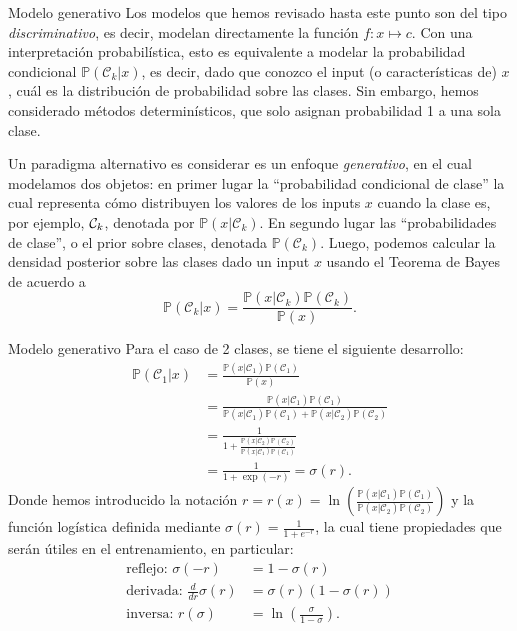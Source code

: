 \documentclass[9pt]{beamer}
\begin{document}
\begin{frame}{Modelo generativo}
Los modelos que hemos revisado hasta este punto son del tipo \emph{discriminativo}, es decir, modelan directamente la función $f:x\mapsto c$. Con una interpretación probabilística, esto es equivalente a modelar la probabilidad condicional $\mathbb{P}(\mathcal{C}_k|x)$, es decir, dado que conozco el input (o características de) $x$, cuál es la distribución de probabilidad sobre las clases. Sin embargo, hemos considerado métodos determinísticos, que solo asignan probabilidad 1 a una sola clase. \pause
\vspace{0.5cm}

Un paradigma alternativo es considerar es un enfoque \emph{generativo}, en el cual modelamos dos  objetos: en primer lugar la ``probabilidad condicional de clase'' la cual representa cómo distribuyen los valores de los inputs $x$ cuando la  clase es, por  ejemplo, ${\mathcal C}_k$, denotada por $\mathbb{P}(x|\mathcal{C}_k)$. En segundo lugar las ``probabilidades de clase'', o el prior sobre clases, denotada $\mathbb{P}(\mathcal{C}_k)$. Luego, podemos calcular la densidad posterior sobre las clases dado un input $x$ usando el Teorema de Bayes de acuerdo a 
\begin{equation*}
  \mathbb{P}(\mathcal{C}_k|x) = \frac{\mathbb{P}(x|\mathcal{C}_k)\mathbb{P}(\mathcal{C}_k)}{\mathbb{P}(x)}.
\end{equation*}

\end{frame}

\begin{frame}{Modelo generativo}
Para el caso de 2 clases, se tiene el siguiente desarrollo: \pause 
\begin{align*}
  \mathbb{P}(\mathcal{C}_1|x) 
  &= \frac{\mathbb{P}(x|\mathcal{C}_1)\mathbb{P}(\mathcal{C}_1)}{\mathbb{P}(x)}\nonumber\\
  &= \frac{\mathbb{P}(x|\mathcal{C}_1)\mathbb{P}(\mathcal{C}_1)}{\mathbb{P}(x|\mathcal{C}_1)\mathbb{P}(\mathcal{C}_1)+\mathbb{P}(x|\mathcal{C}_2)\mathbb{P}(\mathcal{C}_2)}\nonumber\\
  &=\frac{1}{1+\frac{\mathbb{P}(x|\mathcal{C}_2)\mathbb{P}(\mathcal{C}_2)}{\mathbb{P}(x|\mathcal{C}_1)\mathbb{P}(\mathcal{C}_1)}}\nonumber\\
  &=\frac{1}{1+\exp(-r)} = \sigma(r).\label{eq:logistic1}
\end{align*} \pause 
Donde hemos introducido la notación $r = r(x) =\ln\left(\frac{\mathbb{P}(x|\mathcal{C}_1)\mathbb{P}(\mathcal{C}_1)}{\mathbb{P}(x|\mathcal{C}_2)\mathbb{P}(\mathcal{C}_2)}\right)$  y la  función logística definida mediante $\sigma(r) = \frac{1}{1+e^{-r}}$, la cual  tiene propiedades que serán útiles en el entrenamiento, en particular: \pause
\begin{align*}
  \text{reflejo: }\sigma(-r)&=1-\sigma(r)\\
  \text{derivada: }\frac{d}{dr}\sigma(r)&=\sigma(r)(1-\sigma(r))\\
  \text{inversa: }r(\sigma)&=\ln\left(\frac{\sigma}{1-\sigma}\right).
\end{align*}


\end{frame}
\end{document}
